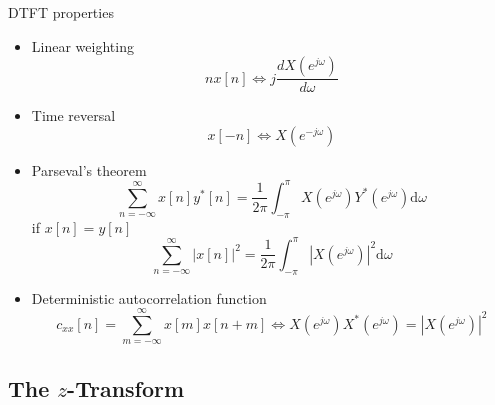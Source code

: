 \documentclass[10pt, handout]{beamer}
\begin{document}
%
\begin{frame}{DTFT properties}
\begin{itemize}
	\item Linear weighting
		\begin{equation*}
		nx[n] \Longleftrightarrow j\frac{dX(e^{j\omega})}{d\omega}
		\end{equation*}
	\item Time reversal
		\begin{equation*}
		x[-n] \Longleftrightarrow X(e^{-j\omega})
		\end{equation*}
	\item Parseval's theorem
		\begin{equation*}
		\sum_{n=-\infty}^{\infty}x[n]y^*[n] = \frac{1}{2\pi}\int_{-\pi}^{\pi}X(e^{j\omega})Y^*(e^{j\omega})\mathrm{d}\omega
		\end{equation*}
		if $x[n] = y[n]$
		\begin{equation*}\tag{signal energy}
		\sum_{n=-\infty}^{\infty}|x[n]|^2 = \frac{1}{2\pi}\int_{-\pi}^{\pi}|X(e^{j\omega})|^2\mathrm{d}\omega
		\end{equation*}	
	\item Deterministic autocorrelation function
		\begin{equation*}
		c_{xx}[n] = \sum_{m=-\infty}^{\infty}x[m]x[n+m] \Longleftrightarrow X(e^{j\omega})X^*(e^{j\omega}) = |X(e^{j\omega})|^2
		\end{equation*}	
\end{itemize}
\end{frame}

%
\subsection{The $z$-Transform}
\end{document}
